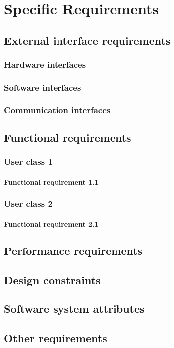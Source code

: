 \chapter{Specific Requirements}

\section{External interface requirements}

\subsection{Hardware interfaces}
\subsection{Software interfaces}
\subsection{Communication interfaces}

\section{Functional requirements}
\subsection{User class 1}
\subsubsection{Functional requirement 1.1}
\subsection{User class 2}
\subsubsection{Functional requirement 2.1}

\section{Performance requirements}
\section{Design constraints}
\section{Software system attributes}
\section{Other requirements}